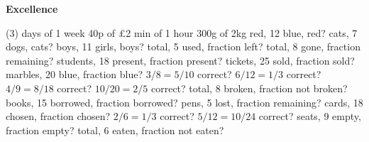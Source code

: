 \documentclass[17pt,a4paper,landscape]{extarticle}
\begin{document}
\sffamily
\boldmath

\boldmath

\boldmath

\boldmath

\boldmath

\boldmath

\boldmath

\boldmath

\boldmath

\boldmath

\boldmath

\boldmath

\boldmath

\boldmath

\boldmath

\boldmath

\boldmath

\boldmath

\boldmath

\boldmath

\boldmath

\boldmath

\vspace*{0.4em}
{\LARGE \textbf{Excellence}}
\begin{tasks}(3)
 days of 1 week
\task 40p of £2
 min of 1 hour
\task 300g of 2kg
 red, 12 blue, red?
 cats, 7 dogs, cats?
 boys, 11 girls, boys?
 total, 5 used, fraction left?
 total, 8 gone, fraction remaining?
 students, 18 present, fraction present?
 tickets, 25 sold, fraction sold?
 marbles, 20 blue, fraction blue?
\task \mbox{$3/8 = 5/10$} correct?
\task \mbox{$6/12 = 1/3$} correct?
\task \mbox{$4/9 = 8/18$} correct?
\task \mbox{$10/20 = 2/5$} correct?
 total, 8 broken, fraction not broken?
 books, 15 borrowed, fraction borrowed?
 pens, 5 lost, fraction remaining?
 cards, 18 chosen, fraction chosen?
\task \mbox{$2/6 = 1/3$} correct?
\task \mbox{$5/12 = 10/24$} correct?
 seats, 9 empty, fraction empty?
 total, 6 eaten, fraction not eaten?
\end{tasks}
\end{document}
